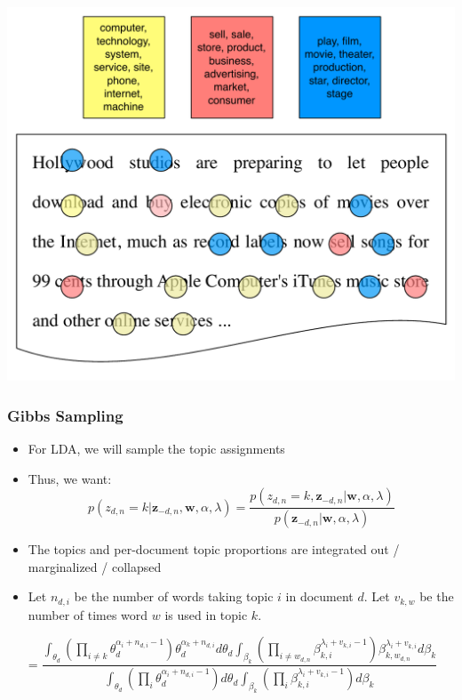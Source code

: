 {\begin{center}
 {\includegraphics[width=.8\linewidth]{topic_models/inference_3}}
	\end{center}
}


\ifconjugacy

\begin{frame}
\frametitle{Gibbs Sampling}
\begin{itemize}
\item For LDA, we will sample the topic assignments
\item Thus, we want:
\begin{equation*}
p(z_{d,n} = k | {\bm z}_{-d,n}, {\bm w}, \alpha, \lambda) = \frac{ p(z_{d,n} = k, {\bm z}_{-d,n} | {\bm w}, \alpha, \lambda)} { p({\bm z}_{-d,n} | {\bm w},\alpha, \lambda)}
\end{equation*}
\pause
\item The topics and per-document topic proportions are integrated out
  / marginalized / collapsed
\item Let $n_{d,i}$ be the number of words taking topic $i$ in document $d$.  Let $v_{k,w}$ be the number of times word $w$ is used in topic $k$.
\end{itemize}


\begin{equation*}
= \frac{ \int_{\theta_d} \left( \prod_{i \not = k} \theta_d^{\alpha_i + n_{d,i} - 1} \right)\theta_d^{\alpha_k + n_{d,i} } d\theta_d \int_{\beta_{k}}    \left( \prod_{i \not = w_{d,n}} \beta_{k,i} ^{ \lambda_i + v_{k,i} - 1} \right) \beta_{k, w_{d,n}}^{\lambda_i + v_{k,i}} d\beta_k } { \int_{\theta_d} \left( \prod_{i} \theta_d^{\alpha_i + n_{d,i} - 1} \right) d\theta_d \int_{\beta_{k}}    \left( \prod_{i} \beta_{k,i} ^{ \lambda_i + v_{k,i} - 1} \right) d\beta_k }
\end{equation*}
\end{frame}

